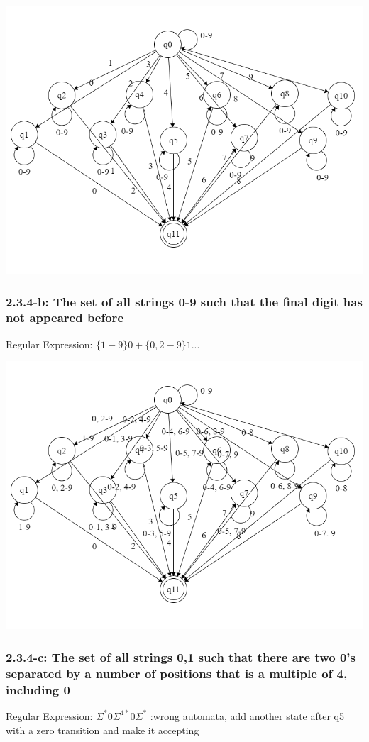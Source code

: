 \documentclass{article}
\theoremstyle{theorem}
\theoremstyle{definition}
\theoremstyle{remark}
\begin{document}
\includegraphics[scale=0.4]{Images/2.3.4a.png}

\subsubsection{2.3.4-b: The set of all strings {0-9} such that the final digit has not appeared before}
Regular Expression: $\{1-9\}0+\{0,2-9\}1...$

\includegraphics[scale=0.4]{Images/2.3.4b.png}

\subsubsection{2.3.4-c: The set of all strings {0,1} such that there are two 0's separated by a number of positions that is a multiple of 4, including 0}
Regular Expression: $\Sigma^*0\Sigma^{4*}0\Sigma^*$ :wrong automata, add another state after q5 with a zero transition and make it accepting
\end{document}
